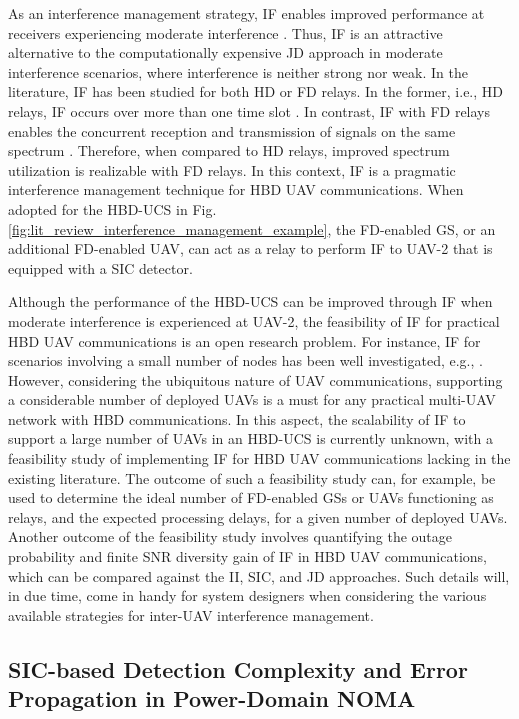 As an interference management strategy, IF enables improved performance at receivers experiencing moderate interference \cite{sirigina2016symbol}. Thus, IF is an attractive alternative to the computationally expensive JD approach in moderate interference scenarios, where interference is neither strong nor weak. In the literature, IF has been studied for both HD or FD relays. In the former, i.e., HD relays, IF occurs over more than one time slot \cite{sirigina2016symbol, chu2018performance}. In contrast, IF with FD relays enables the concurrent reception and transmission of signals on the same spectrum \cite{sirigina2016full,kader2018full}. Therefore, when compared to HD relays, improved spectrum utilization is realizable with FD relays. In this context, IF is a pragmatic interference management technique for HBD UAV communications. When adopted for the HBD-UCS in Fig. \ref{fig:lit_review_interference_management_example}, the FD-enabled GS, or an additional FD-enabled UAV, can act as a relay to perform IF to UAV-2 that is equipped with a SIC detector. 

Although the performance of the HBD-UCS can be improved through IF when moderate interference is experienced at UAV-2, the feasibility of IF for practical HBD UAV communications is an open research problem. For instance, IF for scenarios involving a small number of nodes has been well investigated, e.g., \cite{sirigina2016full, chu2018performance, kader2018full}. However, considering the ubiquitous nature of UAV communications, supporting a considerable number of deployed UAVs is a must for any practical multi-UAV network with HBD communications. In this aspect, the scalability of IF to support a large number of UAVs in an HBD-UCS is currently unknown, with a feasibility study of implementing IF for HBD UAV communications lacking in the existing literature. The outcome of such a feasibility study can, for example, be used to determine the ideal number of FD-enabled GSs or UAVs functioning as relays, and the expected processing delays, for a given number of deployed UAVs. Another outcome of the feasibility study involves quantifying the outage probability and finite SNR diversity gain of IF in HBD UAV communications, which can be compared against the II, SIC, and JD approaches. Such details will, in due time, come in handy for system designers when considering the various available strategies for inter-UAV interference management.

\subsection{SIC-based Detection Complexity and Error Propagation in Power-Domain NOMA}

